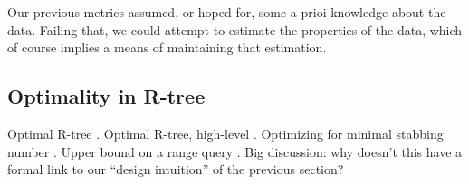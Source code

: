Our previous metrics assumed, or hoped-for, some a prioi knowledge about the data.
Failing that, we could attempt to estimate the properties of the data, which of course implies a means of maintaining that estimation.

\subsection{Optimality in R-tree}
Optimal R-tree \cite{argeberghaverkortyi04}.
Optimal R-tree, high-level \cite{yi12}.
Optimizing for minimal stabbing number \cite{bergkhosraviverdonschotweele11}.
Upper bound on a range query \cite{kanthsingh99}.
Big discussion: why doesn't this have a formal link to our ``design intuition'' of the previous section?
